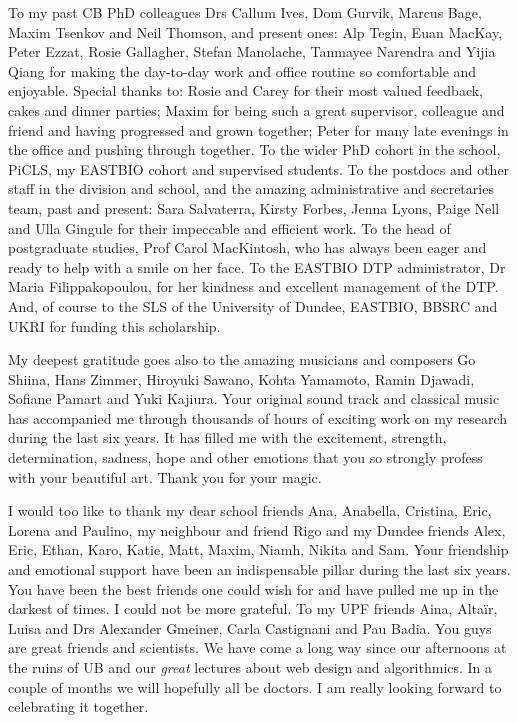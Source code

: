 To my past CB PhD colleagues Drs Callum Ives, Dom Gurvik, Marcus Bage, Maxim Tsenkov and Neil Thomson, and present ones: Alp Tegin, Euan MacKay, Peter Ezzat, Rosie Gallagher, Stefan Manolache, Tanmayee Narendra and Yijia Qiang for making the day-to-day work and office routine so comfortable and enjoyable. Special thanks to: Rosie and Carey for their most valued feedback, cakes and dinner parties; Maxim for being such a great supervisor, colleague and friend and having progressed and grown together; Peter for many late evenings in the office and pushing through together. To the wider PhD cohort in the school, PiCLS, my EASTBIO cohort and supervised students. To the postdocs and other staff in the division and school, and the amazing administrative and secretaries team, past and present: Sara Salvaterra, Kirsty Forbes, Jenna Lyons, Paige Nell and Ulla Gingule for their impeccable and efficient work. To the head of postgraduate studies, Prof Carol MacKintosh, who has always been eager and ready to help with a smile on her face. To the EASTBIO DTP administrator, Dr Maria Filippakopoulou, for her kindness and excellent management of the DTP. And, of course to the SLS of the University of Dundee, EASTBIO, BBSRC and UKRI for funding this scholarship.

My deepest gratitude goes also to the amazing musicians and composers Go Shiina, Hans Zimmer, Hiroyuki Sawano, Kohta Yamamoto, Ramin Djawadi, Sofiane Pamart and Yuki Kajiura. Your original sound track and classical music has accompanied me through thousands of hours of exciting work on my research during the last six years. It has filled me with the excitement, strength, determination, sadness, hope and other emotions that you so strongly profess with your beautiful art. Thank you for your magic.

I would too like to thank my dear school friends Ana, Anabella, Cristina, Eric, Lorena and Paulino, my neighbour and friend Rigo and my Dundee friends Alex, Eric, Ethan, Karo, Katie, Matt, Maxim, Niamh, Nikita and Sam. Your friendship and emotional support have been an indispensable pillar during the last six years. You have been the best friends one could wish for and have pulled me up in the darkest of times. I could not be more grateful. To my UPF friends Aina, Altaïr, Luisa and Drs Alexander Gmeiner, Carla Castignani and Pau Badia. You guys are great friends and scientists. We have come a long way since our afternoons at the ruins of UB and our \textit{great} lectures about web design and algorithmics. In a couple of months we will hopefully all be doctors. I am really looking forward to celebrating it together.

